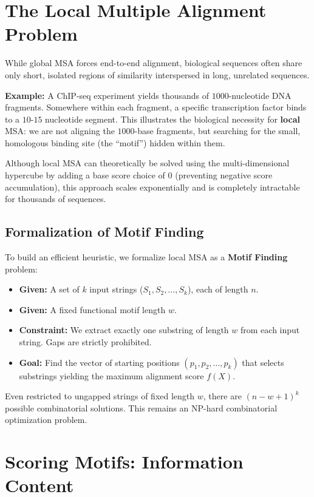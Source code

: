 \section{The Local Multiple Alignment Problem}

While global MSA forces end-to-end alignment, biological sequences often share only short, isolated regions of similarity interspersed in long, unrelated sequences.

\textbf{Example:}
A ChIP-seq experiment yields thousands of $1000$-nucleotide DNA fragments. Somewhere within each fragment, a specific transcription factor binds to a $10$-$15$ nucleotide segment.
This illustrates the biological necessity for \textbf{local} MSA: we are not aligning the $1000$-base fragments, but searching for the small, homologous binding site (the ``motif'') hidden within them.

Although local MSA can theoretically be solved using the multi-dimensional hypercube by adding a base score choice of $0$ (preventing negative score accumulation), this approach scales exponentially and is completely intractable for thousands of sequences. 

\subsection{Formalization of Motif Finding}
To build an efficient heuristic, we formalize local MSA as a \textbf{Motif Finding} problem:
\begin{itemize}
  \item \textbf{Given:} A set of $k$ input strings ($S_1, S_2, \dots, S_k$), each of length $n$.
  \item \textbf{Given:} A fixed functional motif length $w$.
  \item \textbf{Constraint:} We extract exactly one substring of length $w$ from each input string. Gaps are strictly prohibited.
  \item \textbf{Goal:} Find the vector of starting positions $(p_1, p_2, \dots, p_k)$ that selects substrings yielding the maximum alignment score $f(X)$.
\end{itemize}

Even restricted to ungapped strings of fixed length $w$, there are $(n-w+1)^k$ possible combinatorial solutions. This remains an NP-hard combinatorial optimization problem.

\section{Scoring Motifs: Information Content}

